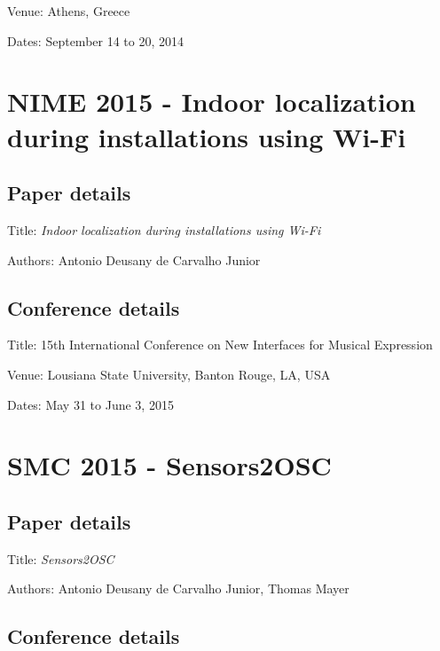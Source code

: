 Venue: Athens, Greece

Dates: September 14 to 20, 2014 



\section{NIME 2015 - Indoor localization during installations using Wi-Fi}
\label{ape:papernime2015}

\subsection*{Paper details}

Title: \textit{Indoor localization during installations using Wi-Fi}

Authors: Antonio Deusany de Carvalho Junior

\subsection*{Conference details}

Title: 15th International Conference on New Interfaces for Musical Expression

Venue: Lousiana State University, Banton Rouge, LA, USA

Dates: May 31 to June 3, 2015



\section{SMC 2015 - Sensors2OSC}
\label{ape:papersmc2015}

\subsection*{Paper details}

Title: \textit{Sensors2OSC}

Authors: Antonio Deusany de Carvalho Junior, Thomas Mayer

\subsection*{Conference details}

